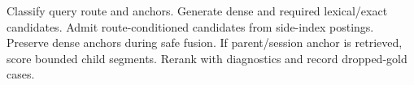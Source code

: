 \begin{algorithmic}
\STATE Classify query route and anchors.
\STATE Generate dense and required lexical/exact candidates.
\STATE Admit route-conditioned candidates from side-index postings.
\STATE Preserve dense anchors during safe fusion.
\STATE If parent/session anchor is retrieved, score bounded child segments.
\STATE Rerank with diagnostics and record dropped-gold cases.
\end{algorithmic}
